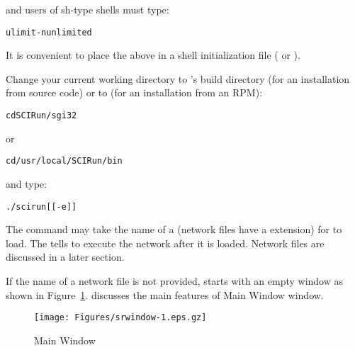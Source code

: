 and users of sh-type shells must type:

\begin{alltt}
  ulimit -n unlimited
\end{alltt}

It is convenient to place the above  in a shell initialization
file ( or ).

\newcommand{\srwindow}{%
  \centerline{\texttt{[image: Figures/srwindow-1.eps.gz]}}
}
\begin{htmlonly}
  \newcommand{\srwindow}{%
    \htmladdimg[alt="SCIRun Window"]{../Figures/srwindow-1.gif}
  }
\end{htmlonly}

Change your current working directory to \sr{}'s
build directory (for an installation from source code) or to
 (for an installation from an RPM):

\begin{alltt}
  cd SCIRun/sgi32
\end{alltt}

or

\begin{alltt}
  cd /usr/local/SCIRun/bin
\end{alltt}

and type:

\begin{alltt}
  ./scirun [ [-e]  ]
\end{alltt}


The  command may take the name of a
 (network files have a  extension)
for \sr{} to load.  The  tells \sr{} to execute the network
after it is loaded.  Network files are discussed in a later section.

If the name of a network file is not provided, \sr{} starts with an empty
  window as shown in Figure~\ref{fig:srwindow}.   discusses the main features
of Main Window window.

\begin{figure}[htb]
  \begin{makeimage}
  \end{makeimage}
  \srwindow
  \caption{\label{fig:srwindow} \sr{} Main Window}
\end{figure}

